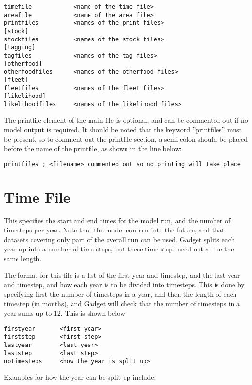 \documentclass[10pt,twoside]{book}
\begin{document}
{\small\begin{verbatim}
timefile            <name of the time file>
areafile            <name of the area file>
printfiles          <names of the print files>
[stock]
stockfiles          <names of the stock files>
[tagging]
tagfiles            <names of the tag files>
[otherfood]
otherfoodfiles      <names of the otherfood files>
[fleet]
fleetfiles          <names of the fleet files>
[likelihood]
likelihoodfiles     <names of the likelihood files>
\end{verbatim}}

The printfile element of the main file is optional, and can be commented out if no model output is required.  It should be noted that the keyword ''printfiles'' must be present, so to comment out the printfile section, a semi colon should be placed before the name of the printfile, as shown in the line below:

{\small\begin{verbatim}
printfiles ; <filename> commented out so no printing will take place
\end{verbatim}}

\section{Time File}\label{sec:timefile}
This specifies the start and end times for the model run, and the number of timesteps per year. Note that the model can run into the future, and that datasets covering only part of the overall run can be used.  Gadget splits each year up into a number of time steps, but these time steps need not all be the same length.

\bigskip
The format for this file is a list of the first year and timestep, and the last year and timestep, and how each year is to be divided into timesteps.  This is done by specifying first the number of timesteps in a year, and then the length of each timestep (in months), and Gadget will check that the number of timesteps in a year sums up to 12.  This is shown below:

{\small\begin{verbatim}
firstyear       <first year>
firststep       <first step>
lastyear        <last year>
laststep        <last step>
notimesteps     <how the year is split up>
\end{verbatim}}

Examples for how the year can be split up include:
\end{document}
